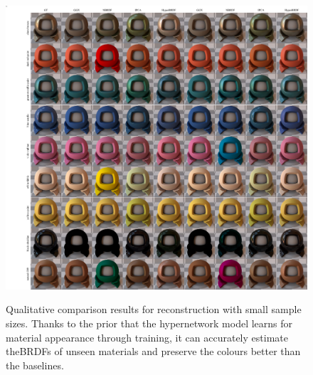 \begin{figure}[t]
  {\includegraphics[width=0.9\linewidth]{Chapters/hyperbrdf-figs/qual_comp_ggx_2.pdf}}
\\
   \caption{Qualitative comparison results for reconstruction with small sample sizes. Thanks to the prior that the hypernetwork model learns for material appearance through training, it can accurately estimate theBRDFs of unseen materials and preserve the colours better than the baselines.}  

   \label{fig:imp_comp_upt}
\end{figure}

